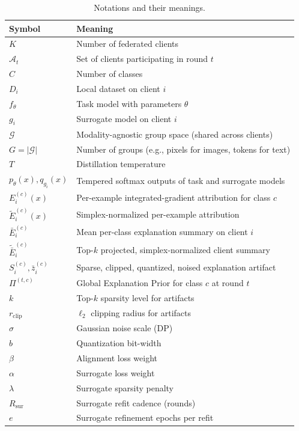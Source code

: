 \documentclass{article}
\theoremstyle{plain}
\theoremstyle{definition}
\theoremstyle{remark}
\begin{document}
\begin{table}[h]
\centering
\small
\caption{Notations and their meanings.}
\label{tab:notation}
\begin{tabular}{ll}
\toprule
Symbol & Meaning \\
\midrule
$K$ & Number of federated clients \\
$\mathcal{A}_t$ & Set of clients participating in round $t$ \\
$C$ & Number of classes \\
$D_i$ & Local dataset on client $i$ \\
$f_\theta$ & Task model with parameters $\theta$ \\
$g_i$ & Surrogate model on client $i$ \\
$\mathcal{G}$ & Modality-agnostic group space (shared across clients) \\
$G = |\mathcal{G}|$ & Number of groups (e.g., pixels for images, tokens for text) \\
$T$ & Distillation temperature \\
$p_\theta(x), q_{g_i}(x)$ & Tempered softmax outputs of task and surrogate models \\
$E_i^{(c)}(x)$ & Per-example integrated-gradient attribution for class $c$ \\
$\tilde{E}_i^{(c)}(x)$ & Simplex-normalized per-example attribution \\
$\bar{E}_i^{(c)}$ & Mean per-class explanation summary on client $i$ \\
$\tilde{\bar{E}}_i^{(c)}$ & Top-$k$ projected, simplex-normalized client summary \\
$S_i^{(c)}, \bar{z}_i^{(c)}$ & Sparse, clipped, quantized, noised explanation artifact \\
$\Pi^{(t,c)}$ & Global Explanation Prior for class $c$ at round $t$ \\
$k$ & Top-$k$ sparsity level for artifacts \\
$r_{\mathrm{clip}}$ & $\ell_2$ clipping radius for artifacts \\
$\sigma$ & Gaussian noise scale (DP) \\
$b$ & Quantization bit-width \\
$\beta$ & Alignment loss weight \\
$\alpha$ & Surrogate loss weight \\
$\lambda$ & Surrogate sparsity penalty \\
$R_{\mathrm{sur}}$ & Surrogate refit cadence (rounds) \\
$e$ & Surrogate refinement epochs per refit \\

\end{tabular}
\end{table}
\end{document}
